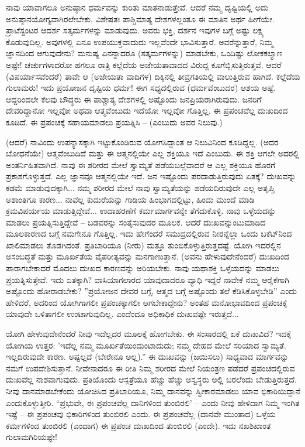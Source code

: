 ನಾವು ಯಾವಾಗಲೂ ಅನುಷ್ಠಾನ ಧರ್ಮವನ್ನು ಕುರಿತು ಮಾತನಾಡುತ್ತೇವೆ. ಆದರೆ ನಮ್ಮ ದೃಷ್ಟಿಯಲ್ಲಿ ಅದು ಅನುಷ್ಠಾನಯೋಗ್ಯವಾಗಿರಲೇಬೇಕು. ವಿಶೇಷತಃ ಪಾಶ್ಚಿಮಾತ್ಯ ದೇಶಗಳಲ್ಲಂತೂ ಈ ಮಾತಿನ ಅರ್ಥ ಹೀಗೆಯೇ. ಪ್ರಾಟೆಸ್ಟಂಟರ ಆದರ್ಶ ಸತ್ಕರ್ಮಗಳನ್ನು ಮಾಡುವುದು. ಅವರು ಭಕ್ತಿ, ದರ್ಶನ ಇವುಗಳ ಬಗ್ಗೆ ಅಷ್ಟು ಲಕ್ಷ್ಯ ಕೊಡುವುದಿಲ್ಲ. ಅವುಗಳಲ್ಲಿ ಏನೂ ಉಪಯುಕ್ತವಾದುದು ಇಲ್ಲವೆಂದೇ ಭಾವಿಸುತ್ತಾರೆ. ಅವರೆನ್ನುತ್ತಾರೆ, ನಿಮ್ಮ ಜ್ಞಾನದಿಂದ ಆಗುವುದೇನು? ಮನುಷ್ಯ ಏನನ್ನಾದರೂ (ಸತ್ಕರ್ಮಗಳನ್ನು) ಮಾಡಬೇಕು, ಒಂದಿಷ್ಟು ಲೋಕಕಲ್ಯಾಣ ಅಷ್ಟೇ! ಚರ್ಚುಗಳಾದರೋ ಹಗಲೂ ರಾತ್ರಿ ಕಲ್ಲೆದೆಯ ಅಜೇಯತಾವಾದದ ವಿರುದ್ದ ಕೂಗೆಬ್ಬಿಸುತ್ತಿರುತ್ತವೆ. ಆದರೆ \break (ವಿಪರ್ಯಾಸವೆಂದರೆ) ತಾವೇ ಆ (ಅಜೇಯತಾ ವಾದಿಗಳ) ದಿಕ್ಕಿನಲ್ಲಿ ತೀವ್ರಗತಿಯಲ್ಲಿ ವಾಲುತ್ತಿರುವ ಹಾಗಿದೆ. ಕಲ್ಲೆದೆಯ ಗುಲಾಮರು! ಇದು ಪ್ರಯೋಜನ ದೃಷ್ಟಿಯ ಧರ್ಮ! ಈಗ ಸಧ್ಯದಲ್ಲಿರುವ (ಧರ್ಮವೆಂಬುದರ) ಆಶಯ ಅಷ್ಟೆ. ಆದ್ದರಿಂದಲೇ ಕೆಲವು ಬೌದ್ಧರು ಈ ಪಾಶ್ಚಾತ್ಯ ದೇಶಗಳಲ್ಲಿ ಅಷ್ಟೊಂದು ಜನಪ್ರಿಯರಾಗಿರುವುದು. ಜನರಿಗೆ ದೇವರಿದ್ದಾನೋ ಇಲ್ಲವೋ ಅಥವಾ ಆತ್ಮವೆಂಬುದು ಇದೆಯೋ ಇಲ್ಲವೋ ಗೊತ್ತಿಲ್ಲ. ಈ ಪ್ರಪಂಚವೆಲ್ಲ ದುಃಖದಿಂದ ಕೂಡಿದೆ. ಈ ಪ್ರಪಂಚಕ್ಕೆ ಸಹಾಯಮಾಡಲು ಪ್ರಯತ್ನಿಸಿ – (ಎಂಬುದು ಅವರ ನಿಲುವು.)

(ಆದರೆ) ನಾವಿಂದು ಉಪನ್ಯಾಸಕ್ಕಾಗಿ ಇಟ್ಟುಕೊಂಡಿರುವ ಯೋಗಸಿದ್ದಾಂತ ಆ ನಿಲುವಿನಿಂದ ಕೂಡಿದ್ದಲ್ಲ. (ಅದರ ಬೋಧನೆಯೇ) ಆತ್ಮವೆಂಬುದಿದೆ ಮತ್ತು ಈ ಆತ್ಮನಲ್ಲಿಯೇ ಎಲ್ಲ ಶಕ್ತಿಯೂ ಇದೆ ಎಂಬುದು. ಈ ಶಕ್ತಿ ಆಗಲೇ ಅದರಲ್ಲಿ ಅಂತರ್ನಿಹಿತವಾಗಿದೆ. ನಾವು ಈ ಶರೀರದ ಮೇಲೆ ಸ್ವಾಮ್ಯತೆ ಪಡೆಯಬಲ್ಲೆವಾದರೆ ಆ ಎಲ್ಲ ಶಕ್ತಿಯೂ ಹೊರಗೆ ಪ್ರಕಾಶಗೊಳ್ಳುತ್ತದೆ. ಎಲ್ಲ ಜ್ಞಾನವೂ ಆತ್ಮನಲ್ಲಿಯೇ ಇದೆ. ಜನ ಇಷ್ಟೊಂದು ಪರದಾಡುತ್ತಿರುವುದು ಏತಕ್ಕೆ? ದುಃಖವನ್ನು ಕಡಮೆ ಮಾಡುವುದಕ್ಕಾಗಿ... ನಮ್ಮ ಶರೀರದ ಮೇಲೆ ನಾವು ಸ್ವಾಮ್ಯತೆಯನ್ನು ಪಡೆಯದಿರುವುದೇ ಎಲ್ಲ ಅತೃಪ್ತಿ ಅಶಾಂತಿಗೂ ಕಾರಣ... ನಾವೆಲ್ಲ ಕುದುರೆಯನ್ನು ಗಾಡಿಯ ಹಿಂಭಾಗದಲ್ಲಿಟ್ಟು, ಹಿಂದು ಮುಂದೆ ಮಾಡಿ ಕ್ರಮವಿಪರ್ಯಯ ಮಾಡುತ್ತಿದ್ದೇವೆ... ಉದಾಹರಣೆಗೆ ಕರ್ಮಮಾರ್ಗವನ್ನೇ ತೆಗೆದುಕೊಳ್ಳಿ. ನಾವು ಒಳ್ಳೆಯದನ್ನು ಮಾಡಲು ಪ್ರಯತ್ನಿಸುತ್ತಿದ್ದೇವೆ – ಬಡವರನ್ನು ಸಂತೈಸುವುದರ ಮೂಲಕ. ಆದರೆ ದುಃಖವನ್ನುಂಟುಮಾಡಿದ ಮೂಲಕಾರಣದ ಬಗ್ಗೆ ನಮಗೇನೂ ಗೊತ್ತಿಲ್ಲ. ಇದು ಹೇಗೆಂದರೆ ಸಮುದ್ರದಲ್ಲಿರುವ ನೀರನ್ನೆಲ್ಲಾ ಒಂದು ಬಕೆಟ್‌ನಿಂದ ಖಾಲಿಮಾಡಲು ತೊಡಗಿದಂತೆ. ಪ್ರತಿಬಾರಿಯೂ (ನೀರು) ಮತ್ತೂ ತುಂಬಿಕೊಳ್ಳುತ್ತಿರುತ್ತದಷ್ಟೆ. ಯೋಗಿ ಇದರಲ್ಲಿನ ಅಸಂಬದ್ಧತೆ ಮತ್ತು ಮೂರ್ಖತೆಯ ವೈಪರೀತ್ಯವನ್ನು ಮನಗಾಣುತ್ತಾನೆ. (ಅವನು ಹೇಳುವುದೇನೆಂದರೆ) ದುಃಖದಿಂದ ಪಾರಾಗಬೇಕಾದರೆ ಮೊದಲು ದುಃಖದ ಕಾರಣವನ್ನು ಅರಿಯಬೇಕು. ನಾವು ಯಥಾಶಕ್ತಿ ಒಳ್ಳೆಯದನ್ನು ಮಾಡಲು ಪ್ರಯತ್ನಿಸುತ್ತೇವೆ. ಇದು ಏತಕ್ಕಾಗಿ? ವಾಸಿಯಾಗಲಾರದ ಯಾವುದಾದರೂ ವ್ಯಾಧಿ ಇದ್ದರೆ ನಾವೇಕೆ ನಮ್ಮ ಆರೈಕೆಗಾಗಿ ಅಷ್ಟೊಂದು ಹೋರಾಡಬೇಕು? ''ಪ್ರಯೋಜನ ದೇವರ ಬಗ್ಗೆ, ಆತ್ಮದ ಬಗ್ಗೆ ಅಷ್ಟೊಂದು ತಲೆ ಕೆಡಿಸಿಕೊಳ್ಳಬೇಡಿ'' ಎಂದು ಹೇಳಿದರೆ, ಅದರಿಂದ ಯೋಗಿಗಾಗಲೀ ಪ್ರಪಂಚಕ್ಕಾಗಲೀ ಆಗಬೇಕಾದ್ದೇನು? ಅಂತಹ ಮನೋಭಾವದಿಂದ ಪ್ರಪಂಚಕ್ಕೆ ಯಾವುದೇ ಒಳಿತಾಗಲೀ ಉಂಟಾಗುವುದಿಲ್ಲ. ಎಂದೆಂದೂ ಅಧಿಕಾಧಿಕ ದುಃಖವಷ್ಟೇ ಇರುತ್ತದೆ...

ಯೋಗಿ ಹೇಳುವುದೇನೆಂದರೆ ನೀವು ಇದೆಲ್ಲದರ ಮೂಲಕ್ಕೆ ಹೋಗಬೇಕು. ಈ ಸಂಸಾರದಲ್ಲಿ ಏಕೆ ದುಃಖವಿದೆ? ಇದಕ್ಕೆ ಯೋಗಿಯ ಉತ್ತರ: 'ಇದೆಲ್ಲ ನಮ್ಮ ಮೂರ್ಖತೆಯಿಂದುಂಟಾದುದು; ನಮ್ಮ ದೇಹದ ಮೇಲೆ ಸರಿಯಾದ ಸ್ವಾಮ್ಯತೆ. ಇಲ್ಲದಿರುವುದೇ ಕಾರಣ. ಅಷ್ಟಲ್ಲದೆ (ಬೇರೇನೂ ಅಲ್ಲ).” ಈ ದುಃಖವನ್ನು (ಜಯಿಸಲು) ಸಾಧ್ಯವಾದ ಮಾರ್ಗವನ್ನು ನಮಗೆ ಉಪದೇಶಿಸುತ್ತಾನೆ. ನೀವೇನಾದರೂ ಈ ರೀತಿ ನಿಮ್ಮ ಶರೀರದ ಮೇಲೆ ನಿಯಂತ್ರಣ ಪಡೆದರೆ ಪ್ರಪಂಚದಲ್ಲಿರುವ ದುಃಖವೆಲ್ಲ ನಾಶವಾಗುವುದು. ಪ್ರತಿಯೊಂದು ಆಸ್ಪತ್ರೆಯೂ ಹೆಚ್ಚು ಹೆಚ್ಚು ಅಸ್ವಸ್ಥರು ಅಲ್ಲಿ ಬರಲೆಂದು ಬೇಡುತ್ತಿರುತ್ತದೆ. ನೀವು ದಾನಮಾಡಬೇಕೆಂದು ಯೋಚಿಸಿದ ಪ್ರತಿಬಾರಿಯೂ, ನಿಮ್ಮ ದಾನವನ್ನು ಸ್ವೀಕಾರಮಾಡಲು ಯಾವ ಭಿಕಾರಿಯಿದ್ದಾನೆ ಎಂದುಕೊಳ್ಳುತ್ತೀರಿ. “ಪ್ರಭುವೇ, ಈ ಪ್ರಪಂಚವೆಲ್ಲ ದಾನಿಗಳಿಂದ ತುಂಬಿರಲಿ' – ಎಂದು ನೀವು ಹೇಳಿದಾಗ ನಿಮ್ಮ ಇಂಗಿತ ಇಷ್ಟೆ – ಈ ಪ್ರಪಂಚವು ಭಿಕಾರಿಗಳಿಂದ ತುಂಬಿರಲಿ ಎಂದು. ಈ ಪ್ರಪಂಚವೆಲ್ಲ (ದಾನವೇ ಮುಂತಾದ) ಒಳ್ಳೆಯ ಕರ್ಮಗಳಿಂದ ತುಂಬಿರಲಿ (ಎಂದಾಗ) ಈ ಪ್ರಪಂಚ ದುಃಖದಿಂದ ತುಂಬಿರಲಿ (ಎಂದೇ). ಇದು ನಖಶಿಖಾಂತ ಗುಲಾಮಗಿರಿಯಷ್ಟೇ!

